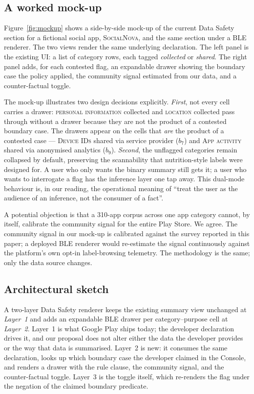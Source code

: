 \documentclass[11pt,a4paper]{article}
\begin{document}
\subsection{A worked mock-up}\label{sec:mockup}

Figure~\ref{fig:mockup} shows a side-by-side mock-up of the current
Data Safety section for a fictional social app, \textsc{SocialNova},
and the same section under a BLE renderer. The two views render the
same underlying declaration. The left panel is the existing UI: a
list of category rows, each tagged \emph{collected} or \emph{shared}.
The right panel adds, for each contested flag, an expandable drawer
showing the boundary case the policy applied, the community signal
estimated from our data, and a counter-factual toggle.



The mock-up illustrates two design decisions explicitly. \emph{First},
not every cell carries a drawer: \textsc{personal information}
collected and \textsc{location} collected pass through without a
drawer because they are not the product of a contested boundary
case. The drawers appear on the cells that \emph{are} the product
of a contested case --- \textsc{Device IDs} shared via service
provider ($b_7$) and \textsc{App activity} shared via anonymised
analytics ($b_9$). \emph{Second}, the unflagged categories remain
collapsed by default, preserving the scannability that
nutrition-style labels were designed for. A user who only wants the
binary summary still gets it; a user who wants to interrogate a
flag has the inference layer one tap away. This dual-mode behaviour
is, in our reading, the operational meaning of ``treat the user as
the audience of an inference, not the consumer of a fact''.

A potential objection is that a 310-app corpus across one app
category cannot, by itself, calibrate the community signal for the
entire Play Store. We agree. The community signal in our mock-up
is calibrated against the survey reported in this paper; a deployed
BLE renderer would re-estimate the signal continuously against
the platform's own opt-in label-browsing telemetry. The methodology
is the same; only the data source changes.

\subsection{Architectural sketch}\label{sec:arch}

A two-layer Data Safety renderer keeps the existing summary view
unchanged at \emph{Layer~1} and adds an expandable BLE drawer per
category--purpose cell at \emph{Layer~2}. Layer~1 is what Google
Play ships today; the developer declaration drives it, and our
proposal does not alter either the data the developer provides or
the way that data is summarised. Layer~2 is new: it consumes the
same declaration, looks up which boundary case the developer
claimed in the Console, and renders a drawer with the rule clause,
the community signal, and the counter-factual toggle. Layer~3 is
the toggle itself, which re-renders the flag under the negation of
the claimed boundary predicate.
\end{document}
